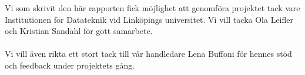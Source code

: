 
Vi som skrivit den här rapporten fick möjlighet att genomföra projektet tack vare Institutionen för Datateknik vid Linköpings universitet. Vi vill tacka Ola Leifler och Kristian Sandahl för gott samarbete.
\\ \\
Vi vill även rikta ett stort tack till vår handledare Lena Buffoni för hennes stöd och feedback under projektets gång.